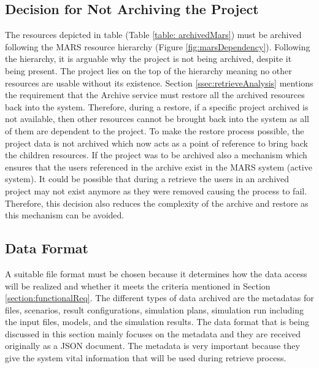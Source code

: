 \subsection{Decision for Not Archiving the Project}
The resources depicted in table (Table \ref{table: archivedMars}) must be archived following the MARS resource hierarchy (Figure \ref{fig:marsDependency}).
Following the hierarchy, it is arguable why the project is not being archived, despite it being present. The project lies on the top of the hierarchy 
meaning no other resources are usable without its existence. Section \ref{ssec:retrieveAnalysis} mentions the requirement that the Archive service must 
restore all the archived resources back into the system. Therefore, during a restore, if a specific project archived
is not available, then other resources cannot be brought back into the system as all of them are dependent to the project. To make the restore process possible,
the project data is not archived which now acts as a point of reference to bring back the children resources. 
If the project was to be archived also a mechanism
which ensures that the users referenced in the archive exist in the MARS system (active system). It could be possible that during a retrieve the users in an
archived project may not exist anymore as they were removed causing the process to fail. Therefore, this decision also reduces the complexity of the 
archive and restore as this mechanism can be avoided.


\subsection{Data Format}
A suitable file format must be chosen because it determines how the data access will be realized and whether it meets
the criteria mentioned in Section \ref{section:functionalReq}. The different types of data archived are the metadatas for files, scenarios, 
result configurations, simulation plans, simulation run including the input files, models, and the simulation results. 
The data format that is being discussed in this section mainly focuses on the metadata and they are received originally as a JSON document.
The metadata is very important because they give the system vital information that will be used during retrieve process. 

